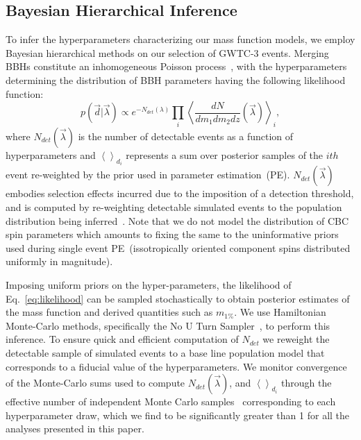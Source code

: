 \documentclass[modern]{aastex631}
\begin{document}
\subsection{Bayesian Hierarchical Inference}
\noindent
To infer the hyperparameters characterizing our mass function models, we employ Bayesian hierarchical methods on our selection of GWTC-3 events. Merging BBHs constitute an inhomogeneous Poisson process~\citep{Mandel:2018mve,pop-vitale,popgw2,popgw3}, with the hyperparameters determining the distribution of BBH parameters having the following likelihood function:
\begin{equation}
    p(\vec{d}|\vec{\lambda}) \propto e^{-N_{det}(\lambda)} \prod_i \left<\frac{dN}{dm_1dm_2dz}(\vec{\lambda})\right>_{i},\label{eq:likelihood}
\end{equation}
where $N_{det}(\vec{\lambda})$ is the number of detectable events as a function of hyperparameters and $\left<\right>_{d_i}$ represents a sum over posterior samples of the $ith$ event re-weighted by the prior used in parameter estimation~(PE). $N_{det}(\vec{\lambda})$ embodies selection effects incurred due to the imposition of a detection threshold, and is computed by re-weighting detectable simulated events to the population distribution being inferred~\citep{Mandel:2018mve,pop-vitale,popgw2,popgw3,Pdet1-Farr,Pdet2-essick}. Note that we do not model the distribution of CBC spin parameters which amounts to fixing the same to the uninformative priors used during single event PE~(issotropically oriented component spins distributed uniformly in magnitude).

Imposing uniform priors on the hyper-parameters, the likelihood of Eq.~\eqref{eq:likelihood} can be sampled stochastically to obtain posterior estimates of the mass function and derived quantities such as $m_{1\%}$. We use Hamiltonian Monte-Carlo methods, specifically the No U Turn Sampler~\citep[NUTS, ][]{HMC, HMC-NUTS}, to perform this inference. To ensure quick and efficient computation of $N_{det}$ we reweight the detectable sample of simulated events to a base line population model that corresponds to a fiducial value of the hyperparameters. We monitor convergence of the Monte-Carlo sums used to compute $N_{det}(\vec{\lambda})$, and $\left<\right>_{d_i}$ through the effective number of independent Monte Carlo samples~\citep{Pdet1-Farr, Pdet2-essick} corresponding to each hyperparameter draw, which we find to be significantly greater than 1 for all the analyses presented in this paper.%
\end{document}
